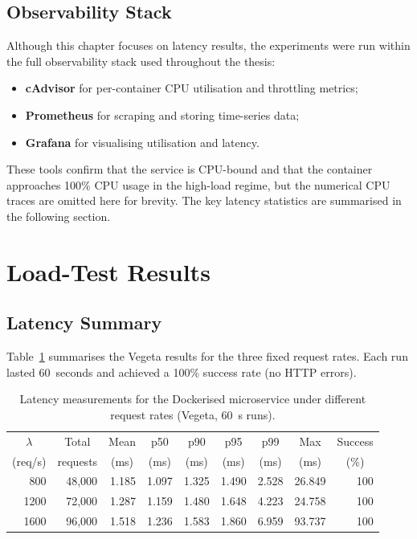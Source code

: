 \subsection{Observability Stack}

Although this chapter focuses on latency results, the experiments were
run within the full observability stack used throughout the thesis:

\begin{itemize}
    \item \textbf{cAdvisor} for per-container CPU utilisation and
    throttling metrics;
    \item \textbf{Prometheus} for scraping and storing time-series data;
    \item \textbf{Grafana} for visualising utilisation and latency.
\end{itemize}

These tools confirm that the service is CPU-bound and that the container
approaches 100\% CPU usage in the high-load regime, but the numerical
CPU traces are omitted here for brevity. The key latency statistics are
summarised in the following section.

\section{Load-Test Results}
\label{sec:prelim-results}

\subsection{Latency Summary}

Table~\ref{tab:vegeta-latency} summarises the Vegeta results for the
three fixed request rates. Each run lasted 60~seconds and achieved a
100\% success rate (no HTTP errors).

\begin{table}[h]
\centering
\caption{Latency measurements for the Dockerised microservice under
different request rates (Vegeta, 60~s runs).}
\label{tab:vegeta-latency}
\begin{tabular}{rrrrrrrrr}
\toprule
\multicolumn{1}{c}{$\lambda$} &
\multicolumn{1}{c}{Total} &
\multicolumn{1}{c}{Mean} &
\multicolumn{1}{c}{p50} &
\multicolumn{1}{c}{p90} &
\multicolumn{1}{c}{p95} &
\multicolumn{1}{c}{p99} &
\multicolumn{1}{c}{Max} &
\multicolumn{1}{c}{Success} \\
\multicolumn{1}{c}{(req/s)} &
\multicolumn{1}{c}{requests} &
\multicolumn{1}{c}{(ms)} &
\multicolumn{1}{c}{(ms)} &
\multicolumn{1}{c}{(ms)} &
\multicolumn{1}{c}{(ms)} &
\multicolumn{1}{c}{(ms)} &
\multicolumn{1}{c}{(ms)} &
\multicolumn{1}{c}{(\%)} \\
\midrule
 800  & 48{,}000 & 1.185 & 1.097 & 1.325 & 1.490 &  2.528 & 26.849 & 100 \\
1200  & 72{,}000 & 1.287 & 1.159 & 1.480 & 1.648 &  4.223 & 24.758 & 100 \\
1600  & 96{,}000 & 1.518 & 1.236 & 1.583 & 1.860 &  6.959 & 93.737 & 100 \\
\bottomrule
\end{tabular}
\end{table}

